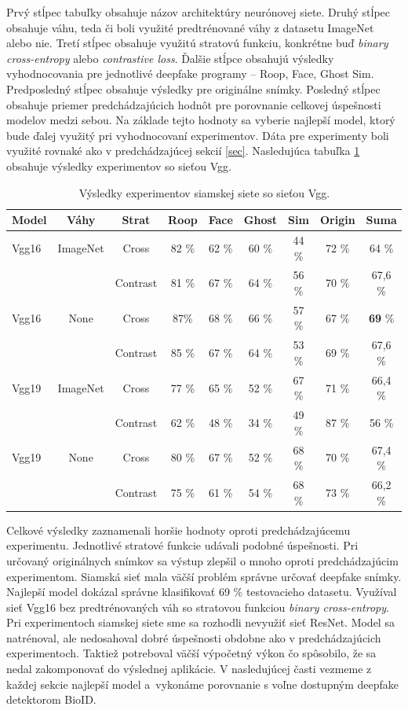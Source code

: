 Prvý stĺpec tabuľky obsahuje názov architektúry neurónovej siete. Druhý stĺpec obsahuje váhu, teda či boli využité predtrénované váhy z datasetu ImageNet alebo nie. Tretí stĺpec obsahuje využitú stratovú funkciu, konkrétne buď \textit{binary cross-entropy} alebo \textit{contrastive loss}. Ďalšie stĺpce obsahujú výsledky vyhodnocovania pre jednotlivé deepfake programy -- Roop, Face, Ghost Sim. Predposledný stĺpec obsahuje výsledky pre originálne snímky. Posledný stĺpec obsahuje priemer predchádzajúcich hodnôt pre porovnanie celkovej úspešnosti modelov medzi sebou. Na základe tejto hodnoty sa vyberie najlepší model, ktorý bude ďalej využitý pri vyhodnocovaní experimentov. Dáta pre experimenty boli využité rovnaké ako v predchádzajúcej sekcií \ref{sec}. Nasledujúca tabuľka \ref{tab:siamese_vgg_results} obsahuje výsledky experimentov so sieťou Vgg.

\begin{table}[H]
\begin{tabular}{|l|c|c|c|c|c|c|c|c|}
\hline
\textbf{Model} & \textbf{Váhy} & \textbf{Strat} & \textbf{Roop} & \textbf{Face} & \textbf{Ghost} & \textbf{Sim} & \textbf{Origin} & \textbf{Suma}\\
\hline
Vgg16 & ImageNet & Cross & 82 \% & 62 \% & 60 \% & 44 \% & 72 \% & 64 \% \\
 &  & Contrast & 81 \% & 67 \% & 64 \% & 56 \% & 70 \% & 67,6 \%\\
 \hline
Vgg16 & None & Cross & 87\% & 68 \% & 66 \% & 57 \% & 67 \% & \textbf{69} \% \\
 &  & Contrast & 85 \% & 67 \% & 64 \% & 53 \% & 69 \% & 67,6 \%\\
\hline
Vgg19 & ImageNet & Cross & 77 \% & 65 \% & 52 \% & 67 \% & 71 \% & 66,4 \% \\
 &  & Contrast & 62 \% & 48 \% & 34 \% & 49 \% & 87 \% & 56 \%\\
 \hline
Vgg19 & None & Cross & 80 \% & 67 \% & 52 \% & 68 \% & 70 \% & 67,4 \% \\
 &  & Contrast & 75 \% & 61 \% & 54 \% & 68 \% & 73 \% & 66,2 \%\\
\hline
\end{tabular}
\centering
\caption{Výsledky experimentov siamskej siete so sieťou Vgg.}
\label{tab:siamese_vgg_results}
\end{table}

Celkové výsledky zaznamenali horšie hodnoty oproti predchádzajúcemu experimentu. Jednotlivé stratové funkcie udávali podobné úspešnosti. Pri určovaný originálnych snímkov sa výstup zlepšil o mnoho oproti predchádzajúcim experimentom. Siamská sieť mala väčší problém správne určovať deepfake snímky. Najlepší model dokázal správne klasifikovať 69 \% testovacieho datasetu. Využíval sieť Vgg16 bez predtrénovaných váh so stratovou funkciou \textit{binary cross-entropy}. Pri experimentoch siamskej siete sme sa rozhodli nevyužiť sieť ResNet. Model sa natrénoval, ale nedosahoval dobré úspešnosti obdobne ako v predchádzajúcich experimentoch. Taktiež potreboval väčší výpočetný výkon čo spôsobilo, že sa nedal zakomponovať do výslednej aplikácie. V nasledujúcej časti vezmeme z každej sekcie najlepší model a~vykonáme porovnanie s voľne dostupným deepfake detektorom BioID.  

